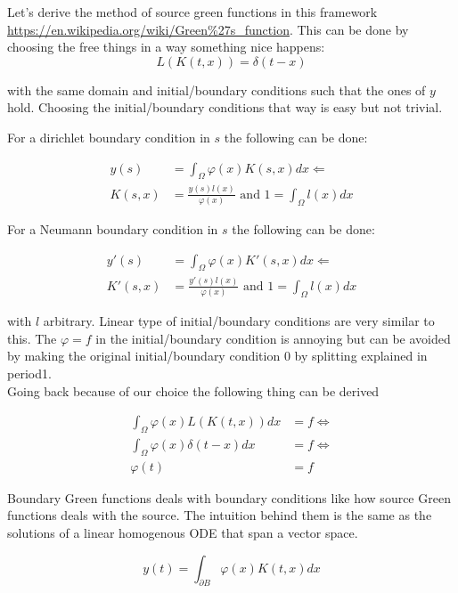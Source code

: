 \documentclass[a4paper,12pt]{article}
\begin{document}
Let's derive the method of source green functions in this framework
\url{https://en.wikipedia.org/wiki/Green%27s_function}. 
This can be done by choosing the free things in a way something nice happens:
$$
    L \left(K(t,x) \right) = \delta(t-x)
$$

with the same  domain and initial/boundary conditions such that the ones of $y$ hold.
Choosing the initial/boundary conditions that way is easy but not trivial.

For a dirichlet boundary condition in $s$ the following can be done:

\begin{align*}
    y(s)   & = \int_{\Omega} \varphi(x) K(s,x)dx \Leftarrow                      \\
    K(s,x) & = \frac{y(s) l(x)}{\varphi(x)} \text{ and } 1 = \int_{\Omega}l(x)dx
\end{align*}

For a Neumann boundary condition in $s$ the following can be done:

\begin{align*}
    y'(s)   & = \int_{\Omega} \varphi(x) K'(s,x)dx \Leftarrow                      \\
    K'(s,x) & = \frac{y'(s) l(x)}{\varphi(x)} \text{ and } 1 = \int_{\Omega}l(x)dx
\end{align*}

with $l$ arbitrary. Linear type of initial/boundary conditions are very similar to this.
The $\varphi = f$ in the initial/boundary condition is annoying but can be avoided
by making the original initial/boundary condition $0$ by splitting explained in period1.\\

Going back because of our choice the following thing can be derived

\begin{align*}
    \int_{\Omega} \varphi(x) L \left(K(t,x) \right)dx & = f \Leftrightarrow \\
    \int_{\Omega} \varphi(x) \delta(t-x)dx            & = f \Leftrightarrow \\
    \varphi(t)                                        & = f
\end{align*}

Boundary Green functions deals with boundary conditions like how source Green functions deals with the source. The intuition behind them is the same as the solutions of a linear homogenous ODE that span a vector space.

$$
    y(t)= \int_{\partial B} \varphi(x) K(t,x) dx
$$
\end{document}
